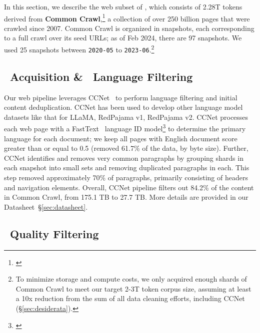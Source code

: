 In this section, we describe the web subset of \dolma, which  consists of 2.28T tokens derived from \textbf{Common Crawl},\footnote{\href{https://commoncrawl.org}{}}
a collection of over 250 billion pages that were crawled since 2007.
Common Crawl is organized in snapshots, each corresponding to a full crawl over its seed URLs;
as of Feb 2024, there are 97 snapshots.
We used 25 snapshots between \texttt{2020-05} to \texttt{2023-06}.\footnote{To minimize storage and compute costs, we only acquired enough shards of Common Crawl to meet our target 2-3T token corpus size, assuming at least a 10x reduction from the sum of all data cleaning efforts, including CCNet (\S\ref{sec:desiderata}).}





\subsection{\toolkitWget~Acquisition \& \toolkitFilter~Language Filtering}
\label{sec:web:acquisition}

Our web pipeline leverages CCNet~\citep{wenzek-etal-2020-ccnet} to perform language filtering and initial content deduplication.
CCNet has been used to develop other language model datasets like that for LLaMA, RedPajama v1, RedPajama v2.
CCNet processes each web page with a FastText~\citep{joulin2016fasttext} language ID model\footnote{\href{https://fasttext.cc/docs/en/language-identification.html}{}} to determine the primary language for each document; 
we keep all pages with English document score greater than or equal to 0.5 (removed 61.7\% of the data, by byte size). 
Further, CCNet identifies and removes very common paragraphs by grouping shards in each snapshot into small sets and removing duplicated paragraphs in each.
This step removed approximately 70\% of paragraphs, primarily consisting of headers and navigation elements.
Overall, CCNet pipeline filters out 84.2\% of the content in Common Crawl, from 175.1 TB to 27.7 TB. 
More details are provided in our Datasheet~\S\ref{sec:datasheet}.













\subsection{\toolkitFilter~Quality Filtering} 
\label{sub:web:quality}

